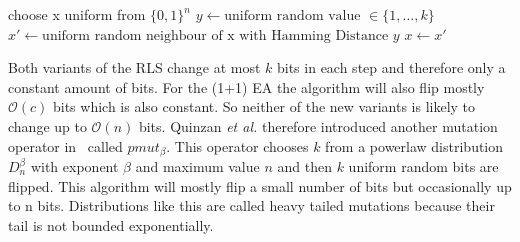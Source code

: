 \begin{algorithm}[bt]
      \caption{\textsc{\RLSR}}\label{alg:rlsR}

      \DontPrintSemicolon %

      \BlankLine
      choose x uniform from ${\{0,1\}}^n$\;
      {
      $y \leftarrow \text{uniform random value }\in \{1,\dots,k\}$\;
      $x' \leftarrow \text{uniform random neighbour of x with Hamming Distance } y$\;
      {
      {
            $x \leftarrow x'$\;
      }
      }
      }
\end{algorithm}

Both variants of the RLS change at most $k$ bits in each step and therefore only a constant amount of bits.
For the (1+1) EA the algorithm will also flip mostly $\mathcal{O}(c)$ bits which is also constant.
So neither of the new variants is likely to change up to $\mathcal{O}(n)$ bits.
Quinzan \textit{et al.} therefore introduced another mutation operator in~\cite{friedrich2018evolutionary} called $pmut_\beta$.
This operator chooses $k$ from a powerlaw distribution $D^\beta_n$ with exponent $\beta$ and maximum value $n$ and then $k$ uniform random bits are flipped.
This algorithm will mostly flip a small number of bits but occasionally up to n bits.
Distributions like this are called heavy tailed mutations because their tail is not bounded exponentially.